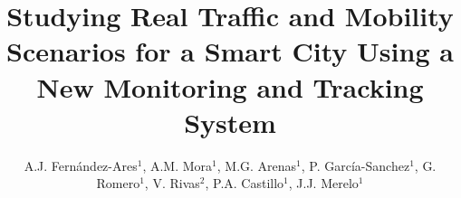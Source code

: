 \documentclass[preprint]{elsarticle}
\begin{document}
\begin{frontmatter}


\title{Studying Real Traffic and Mobility Scenarios for a Smart City Using a New Monitoring and Tracking System}


\author{A.J. Fernández-Ares$^1$, A.M. Mora$^1$, M.G. Arenas$^1$, P. García-Sanchez$^1$, G. Romero$^1$, V. Rivas$^2$, P.A. Castillo$^1$, J.J. Merelo$^1$}
\address{$^1$ Departamento de Arquitectura y Tecnología de Computadores.\\ ETSIIT - CITIC. University of Granada, Spain\\
$^2$ Departamento de Informática. EPS. Universidad de Jaén, Spain}





\end{frontmatter}
\end{document}
